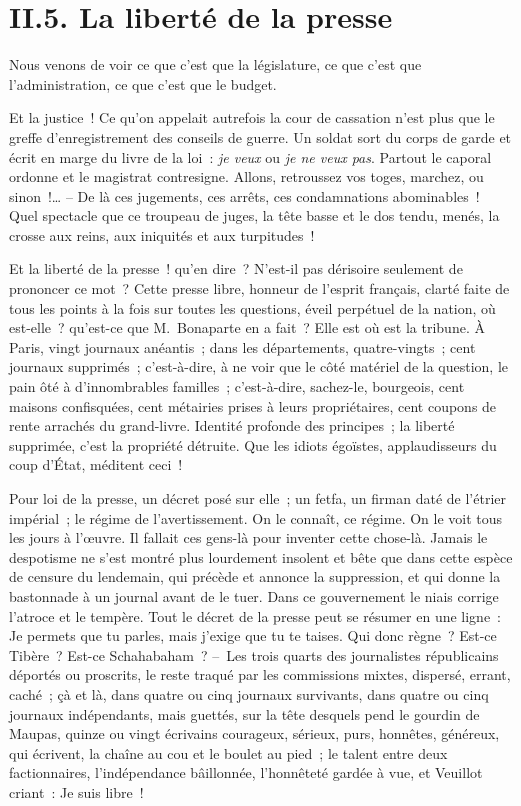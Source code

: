 \documentclass[french,twoside]{book} %
\begin{document}
\section[{II.5. La liberté de la presse}]{II.5. La liberté de la presse}

\noindent Nous venons de voir ce que c’est que la législature, ce que c’est que l’administration, ce que c’est que le budget.\par
Et la justice ! Ce qu’on appelait autrefois la cour de cassation n’est plus que le greffe d’enregistrement des conseils de guerre. Un soldat sort du corps de garde et écrit en marge du livre de la loi : \emph{je veux} ou \emph{je ne veux pas}. Partout le caporal ordonne et le magistrat contresigne. Allons, retroussez vos toges, marchez, ou sinon !… – De là ces jugements, ces arrêts, ces condamnations abominables ! Quel spectacle que ce troupeau de juges, la tête basse et le dos tendu, menés, la crosse aux reins, aux iniquités et aux turpitudes !\par
Et la liberté de la presse ! qu’en dire ? N’est-il pas dérisoire seulement de prononcer ce mot ? Cette presse libre, honneur de l’esprit français, clarté faite de tous les points à la fois sur toutes les questions, éveil perpétuel de la nation, où est-elle ? qu’est-ce que M. Bonaparte en a fait ? Elle est où est la tribune. À Paris, vingt journaux anéantis ; dans les départements, quatre-vingts ; cent journaux supprimés ; c’est-à-dire, à ne voir que le côté matériel de la question, le pain ôté à d’innombrables familles ; c’est-à-dire, sachez-le, bourgeois, cent maisons confisquées, cent métairies prises à leurs propriétaires, cent coupons de rente arrachés du grand-livre. Identité profonde des principes ; la liberté supprimée, c’est la propriété détruite. Que les idiots égoïstes, applaudisseurs du coup d’État, méditent ceci !\par
Pour loi de la presse, un décret posé sur elle ; un fetfa, un firman daté de l’étrier impérial ; le régime de l’avertissement. On le connaît, ce régime. On le voit tous les jours à l’œuvre. Il fallait ces gens-là pour inventer cette chose-là. Jamais le despotisme ne s’est montré plus lourdement insolent et bête que dans cette espèce de censure du lendemain, qui précède et annonce la suppression, et qui donne la bastonnade à un journal avant de le tuer. Dans ce gouvernement le niais corrige l’atroce et le tempère. Tout le décret de la presse peut se résumer en une ligne : Je permets que tu parles, mais j’exige que tu te taises. Qui donc règne ? Est-ce Tibère ? Est-ce Schahabaham ? – Les trois quarts des journalistes républicains déportés ou proscrits, le reste traqué par les commissions mixtes, dispersé, errant, caché ; çà et là, dans quatre ou cinq journaux survivants, dans quatre ou cinq journaux indépendants, mais guettés, sur la tête desquels pend le gourdin de Maupas, quinze ou vingt écrivains courageux, sérieux, purs, honnêtes, généreux, qui écrivent, la chaîne au cou et le boulet au pied ; le talent entre deux factionnaires, l’indépendance bâillonnée, l’honnêteté gardée à vue, et Veuillot criant : Je suis libre !
\end{document}
